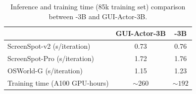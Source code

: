 \begin{table}[!t]
    \centering
    \footnotesize
    \caption{Inference and training time (85k training set) comparison between \method{}-3B and GUI-Actor-3B.}
    \vspace{-1em}
    \begin{tabular}{lcc}
    \toprule
    & \textbf{GUI-Actor-3B} & \textbf{\method{}-3B} \\ 
    \midrule
    ScreenSpot-v2 (s/iteration)  &0.73  & 0.76 \\
    ScreenSpot-Pro (s/iteration) &1.72  & 1.76 \\
    OSWorld-G (s/iteration)      &1.15  &1.23  \\
    \midrule
    Training time (A100 GPU-hours) & $\sim260$ & $\sim192$\\
    \bottomrule
\end{tabular}
    
    \label{tab:time}
\end{table}